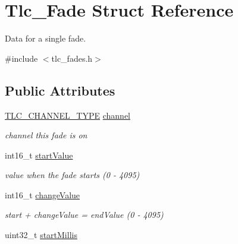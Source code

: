 \hypertarget{structTlc__Fade}{}\section{Tlc\+\_\+\+Fade Struct Reference}
\label{structTlc__Fade}


Data for a single fade.  




{\ttfamily \#include $<$tlc\+\_\+fades.\+h$>$}

\subsection*{Public Attributes}
\begin{DoxyCompactItemize}
\item 
\hyperlink{tlc__config_8h_ab23dc44a3be02131509f5ab61f68530e}{T\+L\+C\+\_\+\+C\+H\+A\+N\+N\+E\+L\+\_\+\+T\+Y\+PE} \hyperlink{structTlc__Fade_a7fe3f4f2ae4c22eede7e36a39cf67bf6}{channel}\hypertarget{structTlc__Fade_a7fe3f4f2ae4c22eede7e36a39cf67bf6}{}\label{structTlc__Fade_a7fe3f4f2ae4c22eede7e36a39cf67bf6}

\begin{DoxyCompactList}\small\item\em channel this fade is on \end{DoxyCompactList}\item 
int16\+\_\+t \hyperlink{structTlc__Fade_a0692ff1a1fccd49b14de937c48ebc1b6}{start\+Value}\hypertarget{structTlc__Fade_a0692ff1a1fccd49b14de937c48ebc1b6}{}\label{structTlc__Fade_a0692ff1a1fccd49b14de937c48ebc1b6}

\begin{DoxyCompactList}\small\item\em value when the fade starts (0 -\/ 4095) \end{DoxyCompactList}\item 
int16\+\_\+t \hyperlink{structTlc__Fade_a7b571bb658d0a556ca36883deb577789}{change\+Value}\hypertarget{structTlc__Fade_a7b571bb658d0a556ca36883deb577789}{}\label{structTlc__Fade_a7b571bb658d0a556ca36883deb577789}

\begin{DoxyCompactList}\small\item\em start + change\+Value = end\+Value (0 -\/ 4095) \end{DoxyCompactList}\item 
uint32\+\_\+t \hyperlink{structTlc__Fade_a33a304e502792a8baa4a4bee7bbff317}{start\+Millis}\hypertarget{structTlc__Fade_a33a304e502792a8baa4a4bee7bbff317}{}\label{structTlc__Fade_a33a304e502792a8baa4a4bee7bbff317}


\end{DoxyCompactItemize}
